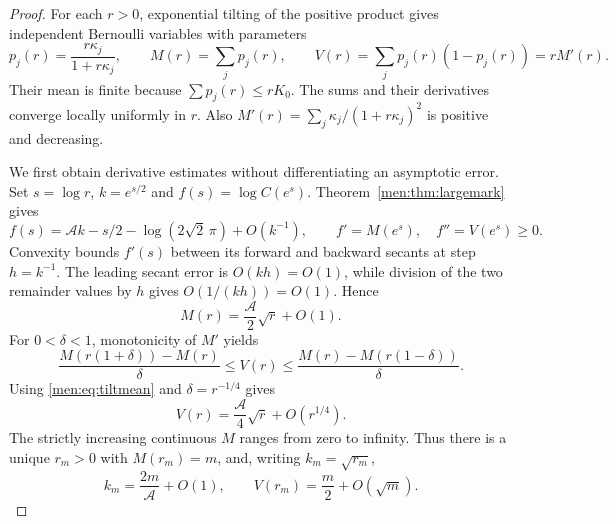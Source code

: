 \documentclass[11pt,letterpaper]{article}
\theoremstyle{remark}\newtheorem{remark}[theorem]{Remark}
\begin{document}
\begin{proof}
For each $r>0$, exponential tilting of the positive product gives independent Bernoulli variables with parameters
\[
 p_j(r)=\frac{r\kappa_j}{1+r\kappa_j},\qquad
 M(r)=\sum_jp_j(r),\qquad
 V(r)=\sum_jp_j(r)(1-p_j(r))=rM'(r).
\]
Their mean is finite because $\sum p_j(r)\le rK_0$. The sums and their derivatives converge locally uniformly in $r$. Also $M'(r)=\sum_j\kappa_j/(1+r\kappa_j)^2$ is positive and decreasing.

We first obtain derivative estimates without differentiating an asymptotic error. Set $s=\log r$, $k=e^{s/2}$ and $f(s)=\log C(e^s)$. Theorem~\ref{men:thm:largemark} gives
\[
 f(s)=\mathcal A k-s/2-\log(2\sqrt2\,\pi)+O(k^{-1}),
 \qquad f'=M(e^s),\quad f''=V(e^s)\ge0.
\]
Convexity bounds $f'(s)$ between its forward and backward secants at step $h=k^{-1}$. The leading secant error is $O(kh)=O(1)$, while division of the two remainder values by $h$ gives $O(1/(kh))=O(1)$. Hence
\begin{equation}\label{men:eq:tiltmean}
 M(r)=\frac{\mathcal A}2\sqrt r+O(1).
\end{equation}
For $0<\delta<1$, monotonicity of $M'$ yields
\[
 \frac{M(r(1+\delta))-M(r)}\delta
 \le V(r)\le
 \frac{M(r)-M(r(1-\delta))}\delta.
\]
Using \eqref{men:eq:tiltmean} and $\delta=r^{-1/4}$ gives
\begin{equation}\label{men:eq:tiltvariance}
 V(r)=\frac{\mathcal A}4\sqrt r+O(r^{1/4}).
\end{equation}
The strictly increasing continuous $M$ ranges from zero to infinity. Thus there is a unique $r_m>0$ with $M(r_m)=m$, and, writing $k_m=\sqrt{r_m}$,
\begin{equation}\label{men:eq:saddlemark}
 k_m=\frac{2m}{\mathcal A}+O(1),\qquad
 V(r_m)=\frac m2+O(\sqrt m).
\end{equation}


\end{proof}
\end{document}
